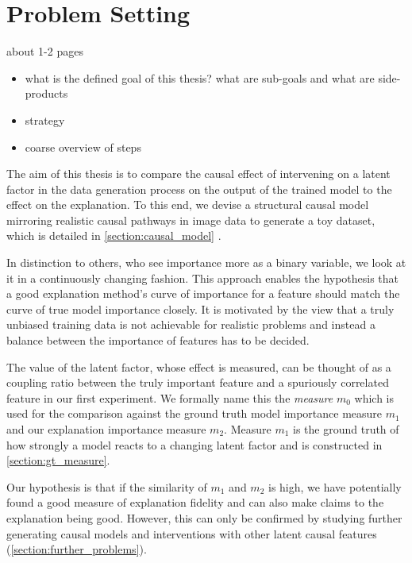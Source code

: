 \chapter{Problem Setting}\label{chapter:problem_setting}
{ \color{red}

    about 1-2 pages

    \begin{itemize}
        \item what is the defined goal of this thesis? what are sub-goals and what are side-products
        \item strategy
        \item coarse overview of steps
    \end{itemize}
}

The aim of this thesis is to compare the causal effect of intervening on a latent factor in the data generation process on the output of the trained model to the effect on the explanation. To this end, we devise a structural causal model mirroring realistic causal pathways in image data to generate a toy dataset, which is detailed in \autoref{section:causal_model} .


In distinction to others, who see importance more as a binary variable, we look at it in a continuously changing fashion. This approach enables the hypothesis that a good explanation method's curve of importance for a feature should match the curve of true model importance closely. It is motivated by the view that a truly unbiased training data is not achievable for realistic problems and instead a balance between the importance of features has to be decided. 

 
The value of the latent factor, whose effect is measured, can be thought of as a coupling ratio between the truly important feature and a spuriously correlated feature in our first experiment. We formally name this the \textit{measure} $m_0$ which is used for the comparison against the ground truth model importance measure $m_1$ and our explanation importance measure $m_2$. Measure $m_1$ is the ground truth of how strongly a model reacts to a changing latent factor and is constructed in \cref{section:gt_measure}. 


Our hypothesis is that if the similarity of $m_1$ and $m_2$ is high, we have potentially found a good measure of explanation fidelity and can also make claims to the explanation being good. However, this can only be confirmed by studying further generating causal models and interventions with other latent causal features (\cref{section:further_problems}). 


